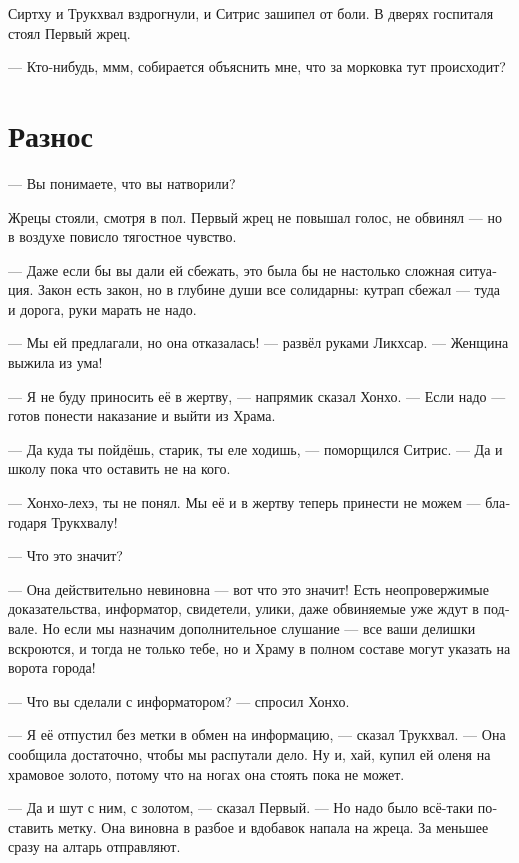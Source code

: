 \documentclass[a4paper,12pt,fleqn]{book}\usepackage{polyglossia}\setdefaultlanguage[babelshorthands=true]{russian}\setotherlanguage{english}\defaultfontfeatures{Ligatures=TeX,Mapping=tex-text}\usepackage{xcolor}\newcommand{\ml}[3]{#2}
\begin{document}
Сиртху и Трукхвал вздрогнули, и Ситрис зашипел от боли.
В дверях госпиталя стоял Первый жрец.

\ml{$0$}
{--- Кто-нибудь, ммм, собирается объяснить мне, что за морковка тут происходит?}
{``Is anybody, hmm, gonna tell me, what the carrot is happening here?''}

\section{Разнос}

--- Вы понимаете, что вы натворили?

Жрецы стояли, смотря в пол.
Первый жрец не повышал голос, не обвинял --- но в воздухе повисло тягостное чувство.

--- Даже если бы вы дали ей сбежать, это была бы не настолько сложная ситуация.
Закон есть закон, но в глубине души все солидарны: кутрап сбежал --- туда и дорога, руки марать не надо.

--- Мы ей предлагали, но она отказалась! --- развёл руками Ликхсар.
--- Женщина выжила из ума!

--- Я не буду приносить её в жертву, --- напрямик сказал Хонхо.
--- Если надо --- готов понести наказание и выйти из Храма.

--- Да куда ты пойдёшь, старик, ты еле ходишь, --- поморщился Ситрис.
--- Да и школу пока что оставить не на кого.

--- Хонхо-лехэ, ты не понял.
Мы её и в жертву теперь принести не можем --- благодаря Трукхвалу!

--- Что это значит?

--- Она действительно невиновна --- вот что это значит!
Есть неопровержимые доказательства, информатор, свидетели, улики, даже обвиняемые уже ждут в подвале.
Но если мы назначим дополнительное слушание --- все ваши делишки вскроются, и тогда не только тебе, но и Храму в полном составе могут указать на ворота города!

--- Что вы сделали с информатором? --- спросил Хонхо.

--- Я её отпустил без метки в обмен на информацию, --- сказал Трукхвал.
--- Она сообщила достаточно, чтобы мы распутали дело.
Ну и, хай, купил ей оленя на храмовое золото, потому что на ногах она стоять пока не может.

--- Да и шут с ним, с золотом, --- сказал Первый.
--- Но надо было всё-таки поставить метку.
Она виновна в разбое и вдобавок напала на жреца.
За меньшее сразу на алтарь отправляют.
\end{document}
